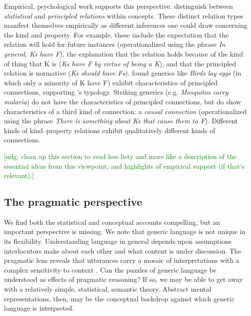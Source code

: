\documentclass[12pt,letterpaper]{article}
\newcommand{\ndg}[1]{\textcolor{Green}{[ndg: #1]}}
\begin{document}
Empirical, psychological work supports this perspective.
 distinguish between \emph{statistical} and \emph{principled relations} within concepts. 
These distinct relation types manifest themselves empirically as different inferences one could draw concerning the kind and property. 
For example, these include the expectation that the relation will hold for future instances (operationalized using the phrase \emph{In general, Ks have F}), the explanation that the relation holds because of the kind of thing that K is (\emph{Ks have F by virtue of being a K}), and that the principled relation is normative (\emph{Ks should have Fs}).
 found generics like \emph{Birds lay eggs} (in which only a minority of K have F) exhibit characteristics of principled connections, supporting 's typology.
Striking generics (e.g. \emph{Mosquitos carry malaria}) do not have the characteristics of principled connections, but do show characteristics of a third kind of connection: a \emph{causal connection} (operationalized using the phrase \emph{There is something about Ks that cause them to F}). 
Different kinds of kind--property relations exhibit qualitatively different kinds of connections. 




\ndg{ clean up this section to read less listy and more like a description of the essential ideas from this viewpoint, and highlights of empirical support (if that's relevant).}


\subsection*{The pragmatic perspective}

We find both the statistical and conceptual accounts compelling, but an important perspective is missing.
We note that generic language is not unique in its flexibility.
Understanding language in general depends upon assumptions interlocutors make about each other and what content is under discussion. 
The pragmatic lens reveals that utterances carry a mosaic of interpretations with a complex sensitivity to context \cite{Clark1996,Grice1975,Levinson2000}. 
Can the puzzles of generic language be understood as effects of pragmatic reasoning?
If so, we may be able to get away with a relatively simple, statistical,  semantic theory.
Abstract mental representations, then, may be the conceptual backdrop against which generic language is interpreted. 
\end{document}
